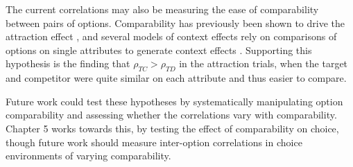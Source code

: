 The current correlations may also be measuring the ease of comparability between pairs of options. Comparability has previously been shown to drive the attraction effect \parencite{noguchi2014attraction,cataldoComparisonProcessAccount2019b,hayes2024attribute}, and several models of context effects rely on comparisons of options on single attributes to generate context effects \parencite{trueblood2014multiattribute,roeMultialternativeDecisionField2001a}. Supporting this hypothesis is the finding that $\rho_{TC}>\rho_{TD}$ in the attraction trials, when the target and competitor were quite similar on each attribute and thus easier to compare.

Future work could test these hypotheses by systematically manipulating option comparability and assessing whether the correlations vary with comparability. Chapter 5 works towards this, by testing the effect of comparability on choice, though future work should measure inter-option correlations in choice environments of varying comparability. 
